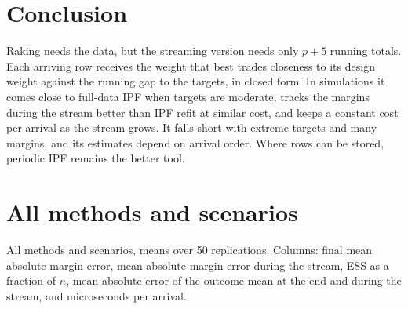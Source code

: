 \documentclass[12pt, letterpaper]{article}
\begin{document}
\section{Conclusion}

Raking needs the data, but the streaming version needs only $p+5$ running totals. Each arriving row receives the weight that best trades closeness to its design weight against the running gap to the targets, in closed form. In simulations it comes close to full-data IPF when targets are moderate, tracks the margins during the stream better than IPF refit at similar cost, and keeps a constant cost per arrival as the stream grows. It falls short with extreme targets and many margins, and its estimates depend on arrival order. Where rows can be stored, periodic IPF remains the better tool.




\appendix
\section{All methods and scenarios}

\begin{table}[H]
\centering
\caption{All methods and scenarios, means over 50 replications. Columns: final mean absolute margin error, mean absolute margin error during the stream, ESS as a fraction of $n$, mean absolute error of the outcome mean at the end and during the stream, and microseconds per arrival.}
\label{tab:full}
\begin{adjustbox}{max width=\textwidth, max totalheight=0.85\textheight}

\end{adjustbox}
\end{table}
\end{document}
